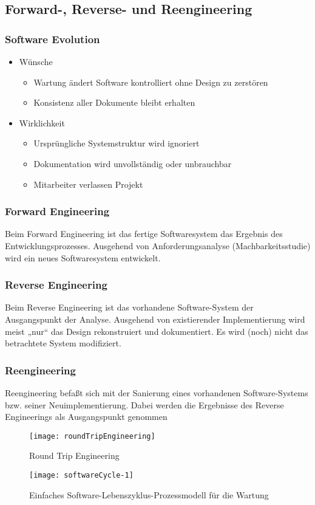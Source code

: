 	\subsection{Forward-, Reverse- und Reengineering}
	\subsubsection{Software Evolution}
	\begin{itemize}
		\item Wünsche
		\begin{itemize}
			\item Wartung ändert Software kontrolliert ohne Design zu zerstören
			\item Konsistenz aller Dokumente bleibt erhalten
		\end{itemize}
		\item Wirklichkeit
		\begin{itemize}
			\item Ursprüngliche Systemstruktur wird ignoriert
			\item Dokumentation wird unvollständig oder unbrauchbar
			\item Mitarbeiter verlassen Projekt
		\end{itemize}
	\end{itemize}
	\subsubsection{Forward Engineering}
	Beim Forward Engineering ist das fertige Softwaresystem das Ergebnis des Entwicklungsprozesses. Ausgehend von Anforderungsanalyse (Machbarkeitsstudie) wird ein neues Softwaresystem entwickelt.
	\subsubsection{Reverse Engineering}
	Beim Reverse Engineering ist das vorhandene Software-System der Ausgangspunkt der Analyse. Ausgehend von existierender Implementierung wird meist „nur“ das Design rekonstruiert und dokumentiert. Es wird (noch) nicht das betrachtete System modifiziert.
	\subsubsection{Reengineering}
	Reengineering befaßt sich mit der Sanierung eines vorhandenen Software-Systems bzw. seiner Neuimplementierung. Dabei werden die Ergebnisse des Reverse Engineerings als Ausgangspunkt genommen
	\begin{figure}[h]
		\centering
		\caption{Round Trip Engineering}
		\texttt{[image: roundTripEngineering]}
	\end{figure}
	\begin{figure}[h]
		\centering
		\caption{Einfaches Software-Lebenszyklus-Prozessmodell für die Wartung}
		\texttt{[image: softwareCycle-1]}
	\end{figure}
